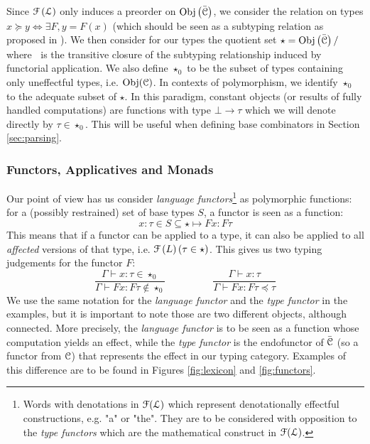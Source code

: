 Since $\mathcal{F}\left( \mathcal{L} \right)$ only induces a preorder on
$\operatorname{Obj}\left( \bar{\mathcal{C}} \right)$, we consider the relation on types
$x\succeq y \Leftrightarrow \exists F, y = F(x)$ (which should be seen
as a subtyping relation as proposed in \cite{melliesFunctorsAreType2015}).
We then consider for our types the quotient set
$\star = \operatorname{Obj}\left(\bar{\mathcal{C}}\right) / ~$ where $~$ is the transitive closure of
the subtyping relationship induced by functorial application.
We also define $\star_{0}$ to be the subset of types containing only
uneffectful types, i.e. $\operatorname{Obj}(\mathcal{C})$.
In contexts of polymorphism, we identify $\star_{0}$ to the adequate subset of
$\star$.
In this paradigm, constant objects (or results of fully handled computations) are
functions with type $\bot \to \tau$ which we will denote directly by
$\tau \in \star_{0}$.
This will be useful when defining base combinators in Section \ref{sec:parsing}.

\subsubsection{Functors, Applicatives and Monads}
Our point of view has us consider \emph{language functors}\footnote{Words with
	denotations in $\mathcal{F}(\mathcal{L})$ which represent denotationally effectful
	constructions, e.g. "a" or "the". They are to be considered with opposition to
	the \emph{type functors} which are the mathematical construct in $\mathcal{F}(\mathcal{L})$.}
as polymorphic functions: for a
(possibly restrained) set of base types $S$, a functor is seen as a function:
\begin{equation*}
	x: \tau\in S\subseteq \star \mapsto F x: F\tau
\end{equation*}
This means that if a functor can be applied to a type, it can also be applied
to all \emph{affected} versions of that type, i.e.
$\mathcal{F}\left( L \right)(\tau\in \star)$.
This gives us two typing judgements for the functor $F$:
\begin{equation*}
	\frac{\Gamma\vdash x: \tau \in \star_{0}}{\Gamma\vdash F x: F\tau \notin
		\star_{0}} \hspace{2cm} \frac{\Gamma\vdash x:
		\tau}{\Gamma\vdash Fx : F\tau\preceq \tau}
\end{equation*}
We use the same notation for the \emph{language functor} and the
\emph{type functor} in the examples, but it is important to note those are two
different objects, although connected.
More precisely, the \emph{language functor} is to be seen as a function whose
computation yields an effect, while the \emph{type functor} is the endofunctor
of $\bar{\mathcal{C}}$ (so a functor from $\mathcal{C}$) that represents the effect in our
typing category.
Examples of this difference are to be found in Figures \ref{fig:lexicon} and
\ref{fig:functors}.

